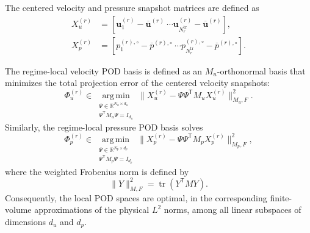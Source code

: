 The centered velocity and pressure snapshot matrices are defined as
\begin{align}
X_u^{(r)}
&=
\left[
\boldsymbol{u}^{(r)}_1-\overline{\boldsymbol{u}}^{(r)}
\ \cdots
\boldsymbol{u}^{(r)}_{N_r^{\mathrm{tr}}}
-\overline{\boldsymbol{u}}^{(r)}
\right],
\label{eq:centered_velocity_snapshots} \\
X_p^{(r)}
&=
\left[
p^{(r),\circ}_1-\overline{p}^{(r),\circ}
\ \cdots
p^{(r),\circ}_{N_r^{\mathrm{tr}}}
-\overline{p}^{(r),\circ}
\right].
\label{eq:centered_pressure_snapshots}
\end{align}

The regime-local velocity POD basis is defined as an
$M_u$-orthonormal basis that minimizes the total projection error of the
centered velocity snapshots:
\begin{equation}
\Phi_u^{(r)}
\in
\underset{
\substack{
\Psi\in\mathbb{R}^{N_u\times d_u}\\
\Psi^{\mathsf T}M_u\Psi=I_{d_u}
}
}{\operatorname{arg\,min}}
\bigl\|
X_u^{(r)}
-
\Psi\Psi^{\mathsf T}M_uX_u^{(r)}
\bigr\|_{M_u,F}^{2}.
\label{eq:velocity_pod_minimization}
\end{equation}
Similarly, the regime-local pressure POD basis solves
\begin{equation}
\Phi_p^{(r)}
\in
\underset{
\substack{
\Psi\in\mathbb{R}^{N_p\times d_p}\\
\Psi^{\mathsf T}M_p\Psi=I_{d_p}
}
}{\operatorname{arg\,min}}
\bigl\|
X_p^{(r)}
-
\Psi\Psi^{\mathsf T}M_pX_p^{(r)}
\bigr\|_{M_p,F}^{2},
\label{eq:pressure_pod_minimization}
\end{equation}
where the weighted Frobenius norm is defined by
\begin{equation}
\|Y\|_{M,F}^{2} = \operatorname{tr}\left(Y^{\mathsf T}MY\right).
\label{eq:weighted_frobenius_norm}
\end{equation}
Consequently, the local POD spaces are optimal, in the corresponding
finite-volume approximations of the physical $L^2$ norms, among all linear
subspaces of dimensions $d_u$ and $d_p$.

